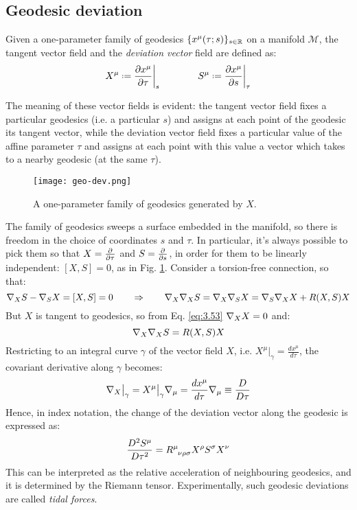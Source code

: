 \subsection{Geodesic deviation}
\label{sec-geo-dev}

\begin{definition}
  Given a one-parameter family of geodesics $ \{x^\mu(\tau;s)\}_{s \in \mathbb{R}} $ on a manifold $ \mathcal{M} $, the tangent vector field and the \textit{deviation vector} field are defined as:
  \begin{equation}
    X^\mu \defeq \frac{\pa x^\mu}{\pa \tau}\bigg\vert_s
    \qquad \qquad
    S^\mu \defeq \frac{\pa x^\mu}{\pa s}\bigg\vert_\tau
    \label{eq:3.56}
  \end{equation}
\end{definition}
The meaning of these vector fields is evident: the tangent vector field fixes a particular geodesics (i.e. a particular $ s $) and assigns at each point of the geodesic its tangent vector, while the deviation vector field fixes a particular value of the affine parameter $ \tau $ and assigns at each point with this value a vector which takes to a nearby geodesic (at the same $ \tau $).

\begin{figure}
  \centering
  \texttt{[image: geo-dev.png]}
  \caption{A one-parameter family of geodesics generated by $ X $.}
  \label{geo-dev}
\end{figure}

The family of geodesics sweeps a surface embedded in the manifold, so there is freedom in the choice of coordinates $ s $ and $ \tau $. In particular, it's always possible to pick them so that $ X = \frac{\partial}{\partial \tau} $ and $ S = \frac{\partial}{\partial s} $, in order for them to be linearly independent: $ [X,S] = 0 $, as in Fig. \ref{geo-dev}. Consider a torsion-free connection, so that:
\begin{equation*}
  \nabla_X S - \nabla_S X = [X,S] = 0
  \qquad \Rightarrow \qquad
  \nabla_X \nabla_X S = \nabla_X \nabla_S X = \nabla_S \nabla_X X + R(X,S) X
\end{equation*}
But $ X $ is tangent to geodesics, so from Eq. \ref{eq:3.53} $ \nabla_X X = 0 $ and:
\begin{equation}
  \nabla_X \nabla_X S = R(X,S) X
  \label{eq:3.57}
\end{equation}
Restricting to an integral curve $ \gamma $ of the vector field $ X $, i.e. $ X^\mu \vert_\gamma = \frac{dx^\mu}{d\tau} $, the covariant derivative along $ \gamma $ becomes:
\begin{equation*}
  \nabla_X\big\vert_\gamma = X^\mu\big\vert_\gamma \nabla_\mu = \frac{dx^\mu}{d\tau} \nabla_\mu \equiv \frac{D}{D\tau}
\end{equation*}
Hence, in index notation, the change of the deviation vector along the geodesic is expressed as:
\begin{equation}
  \frac{D^2 S^\mu}{D\tau^2} = \tensor{R}{^\mu _{\nu \rho \sigma}} X^\rho S^\sigma X^\nu
  \label{eq:3.58}
\end{equation}
This can be interpreted as the relative acceleration of neighbouring geodesics, and it is determined by the Riemann tensor. Experimentally, such geodesic deviations are called \textit{tidal forces}.

